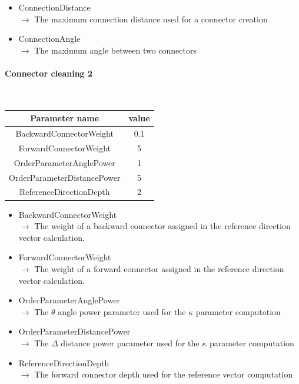 \documentclass[12pt]{article}
\begin{document}
\begin{itemize}
  \item ConnectionDistance \\
  $\rightarrow$ The maximum connection distance used for a connector creation
  \item ConnectionAngle \\
  $\rightarrow$ The maximum angle between two connectors
\end{itemize}


\newpage
\paragraph{Connector cleaning 2} ~

\begin{table}[!ht]
  \begin{center}
    \begin{tabu} to \linewidth { c | c } 
          Parameter name & value \\
          \hline
          BackwardConnectorWeight & 0.1 \\
          ForwardConnectorWeight & 5 \\
          OrderParameterAnglePower & 1 \\
          OrderParameterDistancePower & 5 \\
          ReferenceDirectionDepth & 2
    \end{tabu} 
  \end{center}
\end{table}

\begin{itemize}
  \item BackwardConnectorWeight \\
  $\rightarrow$ The weight of a backward connector assigned in the reference direction vector calculation.
  \item ForwardConnectorWeight \\
  $\rightarrow$ The weight of a forward connector assigned in the reference direction vector calculation.
  \item OrderParameterAnglePower \\
  $\rightarrow$ The $\theta$ angle power parameter used for the $\kappa$ parameter computation
  \item OrderParameterDistancePower \\
  $\rightarrow$ The $\Delta$ distance power parameter used for the $\kappa$ parameter computation
  \item ReferenceDirectionDepth \\
  $\rightarrow$ The forward connector depth used for the reference vector computation
\end{itemize}
\end{document}
